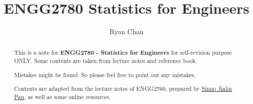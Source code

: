 \documentclass[a4paper]{report}
\author{Ryan Chan}
\title{ENGG2780 Statistics for Engineers}
\begin{document}
\setlength\parindent{0pt}

\maketitle

\newpage

\begin{abstract}
	This is a note for \textbf{ENGG2780 - Statistics for Engineers} for self-revision purpose ONLY. Some contents are taken from lecture notes and reference book.
	
	Mistakes might be found. So please feel free to point out any mistakes.
	
	Contents are adapted from the lecture notes of ENGG2760, prepared by \href{https://www.cse.cuhk.edu.hk/~sinnopan/}{Sinno Jialin Pan}, as well as some online resources.
\end{abstract}

\newpage

\tableofcontents

\setlength{\parskip}{5pt}
\end{document}
